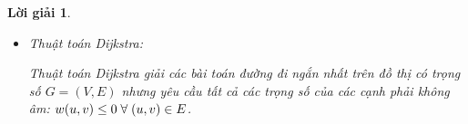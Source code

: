 \documentclass[14pt, a4paper]{article}
\theoremstyle{sltheorem}
\theoremstyle{soltheorem}
\newtheorem*{loigiai}{Lời giải}
\begin{document}
\begin{loigiai}
\begin{itemize}
\begin{itemize}
\begin{algorithm}[h!]

                    \caption{Thuật toán Bellman-Ford}
                    \label{alg:Bellman-Ford}
                \end{algorithm}

                Để truy vết tìm đường đi ngắn nhất từ đỉnh bắt đầu $s$ đến đỉnh $v$ (giả sử đồ thị $G$ không tồn tại một chu trình âm),
                ta sử dụng mảng $p$ đã được xây dựng ở thuật toán \ref{alg:Bellman-Ford}:

                \begin{algorithm}[h!]
                    \DontPrintSemicolon
                    
                    $path \gets \lbrack \rbrack$\;
                    $u \gets v$\;
                    $path \gets reverse(path)$\;
                    \;
                    \caption{Truy vết thuật toán Bellman-Ford}
                    \label{alg:Bellman-Ford-Trace}
                \end{algorithm}
                \item Thuật toán Dijkstra:

                Thuật toán Dijkstra giải các bài toán đường đi ngắn nhất trên đồ thị có trọng số
                $G=(V, E)$ nhưng yêu cầu tất cả các trọng số của các cạnh phải không âm: $w(u, v) \leq 0 \thickspace \forall \thickspace (u, v) \in E$.
                

\end{itemize}
\end{itemize}
\end{loigiai}
\end{document}
